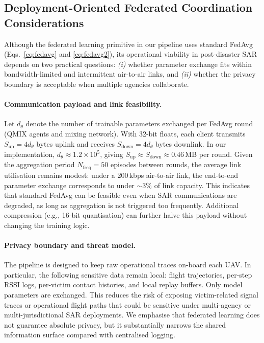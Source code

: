 \documentclass[drones,article,accept,pdftex,moreauthors]{Definitions/mdpi}
\begin{document}
\subsection{Deployment-Oriented Federated Coordination Considerations}
\label{sec:deployment}

Although the federated learning primitive in our pipeline uses standard FedAvg
(Eqs.~\eqref{eq:fedavg} and \eqref{eq:fedavg2}), its operational viability in
post-disaster SAR depends on two practical questions: \emph{(i)} whether parameter
exchange fits within bandwidth-limited and intermittent air-to-air links, and
\emph{(ii)} whether the privacy boundary is acceptable when multiple agencies
collaborate.

\paragraph{Communication payload and link feasibility.}
Let $d_\theta$ denote the number of trainable parameters exchanged per FedAvg round
(QMIX agents and mixing network). With 32-bit floats, each client transmits
$S_{\text{up}} = 4d_\theta$ bytes uplink and receives $S_{\text{down}} = 4d_\theta$
bytes downlink. In our implementation, $d_\theta \approx 1.2\times 10^5$, giving
$S_{\text{up}} \approx S_{\text{down}} \approx 0.46$\,MB per round. Given the
aggregation period $N_{\text{freq}}=50$ episodes between rounds, the average link
utilisation remains modest: under a 200\,kbps air-to-air link, the end-to-end
parameter exchange corresponds to under $\sim 3\%$ of link capacity. This indicates
that standard FedAvg can be feasible even when SAR communications are degraded, as
long as aggregation is not triggered too frequently. Additional compression
(e.g., 16-bit quantisation) can further halve this payload without changing the
training logic.

\paragraph{Privacy boundary and threat model.}
The pipeline is designed to keep raw operational traces on-board each UAV. In
particular, the following sensitive data remain local: flight trajectories, per-step
RSSI logs, per-victim contact histories, and local replay buffers. Only model
parameters are exchanged. This reduces the risk of exposing victim-related signal
traces or operational flight paths that could be sensitive under multi-agency or
multi-jurisdictional SAR deployments. We emphasise that federated learning does not
guarantee absolute privacy, but it substantially narrows the shared information
surface compared with centralised logging.
\end{document}
